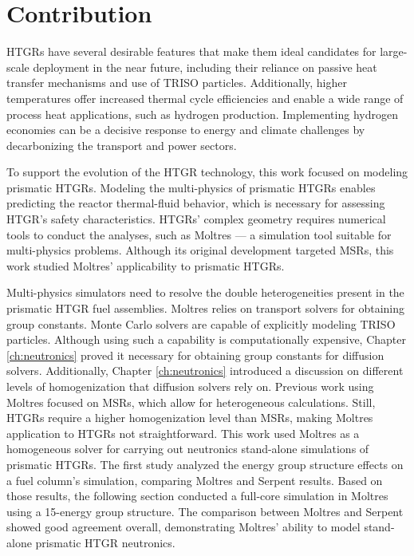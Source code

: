 \section{Contribution}

HTGRs have several desirable features that make them ideal candidates for large-scale deployment in the near future, including their reliance on passive heat transfer mechanisms and use of TRISO particles.
Additionally, higher temperatures offer increased thermal cycle efficiencies and enable a wide range of process heat applications, such as hydrogen production.
Implementing hydrogen economies can be a decisive response to energy and climate challenges by decarbonizing the transport and power sectors.

To support the evolution of the HTGR technology, this work focused on modeling prismatic HTGRs.
Modeling the multi-physics of prismatic HTGRs enables predicting the reactor thermal-fluid behavior, which is necessary for assessing HTGR's safety characteristics.
HTGRs' complex geometry requires numerical tools to conduct the analyses, such as Moltres --- a simulation tool suitable for multi-physics problems.
Although its original development targeted MSRs, this work studied Moltres' applicability to prismatic HTGRs.

Multi-physics simulators need to resolve the double heterogeneities present in the prismatic HTGR fuel assemblies.
Moltres relies on transport solvers for obtaining group constants.
Monte Carlo solvers are capable of explicitly modeling TRISO particles.
Although using such a capability is computationally expensive, Chapter \ref{ch:neutronics} proved it necessary for obtaining group constants for diffusion solvers.
Additionally, Chapter \ref{ch:neutronics} introduced a discussion on different levels of homogenization that diffusion solvers rely on.
Previous work using Moltres focused on MSRs, which allow for heterogeneous calculations.
Still, HTGRs require a higher homogenization level than MSRs, making Moltres application to HTGRs not straightforward.
This work used Moltres as a homogeneous solver for carrying out neutronics stand-alone simulations of prismatic HTGRs.
The first study analyzed the energy group structure effects on a fuel column's simulation, comparing Moltres and Serpent results.
Based on those results, the following section conducted a full-core simulation in Moltres using a 15-energy group structure.
The comparison between Moltres and Serpent showed good agreement overall, demonstrating Moltres' ability to model stand-alone prismatic HTGR neutronics.


